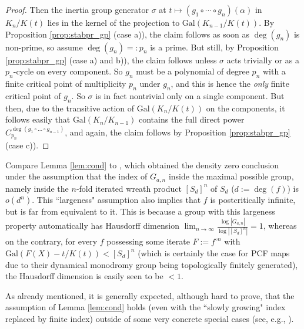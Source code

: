 \documentclass[a4paper]{amsart}
\begin{document}
\begin{proof}
 Then the inertia group generator $\sigma$ at $t\mapsto (g_1\circ \cdots \circ g_n)(\alpha)$ in $K_n/K(t)$ lies in the kernel of the projection to $\textrm{Gal}(K_{n-1}/K(t))$. By Proposition \ref{prop:stabpr_gp} (case a)), the claim follows as soon as $\deg(g_n)$ is non-prime, so assume $\deg(g_n)=:p_n$ is a prime. But still, by Proposition \ref{prop:stabpr_gp} (case a) and b)), the claim follows unless $\sigma$ acts trivially or as a $p_n$-cycle on every component. So $g_n$ must be a polynomial of degree $p_n$ with a finite critical point of multiplicity $p_n$ under $g_n$, and this is hence the {\it only} finite critical point of $g_n$. So  
 $\sigma$ is in fact nontrivial only on a single component. But then, due to the transitive action of $\textrm{Gal}(K_n/K(t))$ on the components, it follows easily that $\textrm{Gal}(K_n/K_{n-1})$ contains the full direct power $C_{p_n}^{\deg(g_1\circ\dots\circ g_{n-1})}$, and again, the claim follows by Proposition \ref{prop:stabpr_gp} (case c)). 
  \end{proof}

  \begin{remark}
  \label{rem:ferr}
  Compare Lemma \ref{lem:cond} to \cite[Theorem 2.3]{Ferr}, which obtained the density zero conclusion under the assumption that the index of $G_{a,n}$ inside the maximal possible group, namely inside the $n$-fold iterated wreath product $[S_d]^n$ of $S_d$ ($d:=\deg(f)$) is $o(d^n)$. This ``largeness" assumption also implies that $f$ is postcritically infinite, but is far from equivalent to it.
  This is because a group with this largeness property automatically has Hausdorff dimension $\lim_{n\to \infty} \frac{\log|G_{a,n}|}{\log|[S_d]^n|} = 1$, whereas on the contrary, for every $f$ possessing some iterate $F:=f^{\circ n}$ with $\textrm{Gal}(F(X)-t/K(t)) < [S_d]^n$ (which is certainly the case for PCF maps due to their dynamical monodromy group being topologically finitely generated), the Hausdorff dimension is easily seen to be $<1$.
  \end{remark}
  
 As already mentioned, it is generally expected, although hard to prove, that the assumption of Lemma \ref{lem:cond} holds (even with the ``slowly growing" index replaced by finite index) outside of some very concrete special cases (see, e.g., \cite{BDGHT}).
\end{document}
